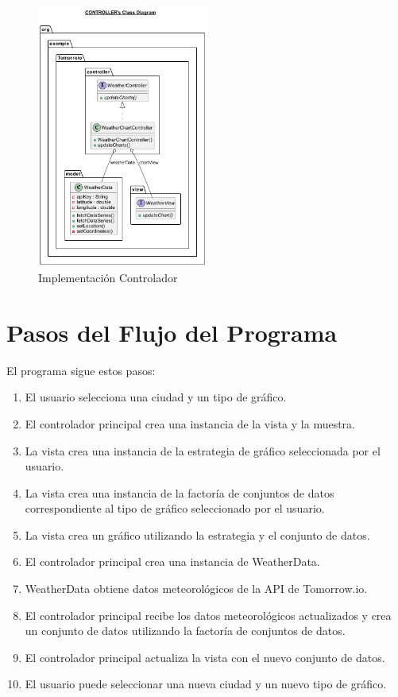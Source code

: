 \documentclass{article}
\begin{document}
\begin{figure}[H]
  \centering
  \includegraphics[width=0.5\textwidth]{images/image3.png}
  \caption {Implementación Controlador}
  \label{fig:image3}
\end{figure}

\section{Pasos del Flujo del Programa}
El programa sigue estos pasos:

\begin{enumerate}
  \item El usuario selecciona una ciudad y un tipo de gráfico.
  \item El controlador principal crea una instancia de la vista y la muestra.
  \item La vista crea una instancia de la estrategia de gráfico seleccionada por el usuario.
  \item La vista crea una instancia de la factoría de conjuntos de datos correspondiente al tipo de gráfico seleccionado por el usuario.
  \item La vista crea un gráfico utilizando la estrategia y el conjunto de datos.
  \item El controlador principal crea una instancia de WeatherData.
  \item WeatherData obtiene datos meteorológicos de la API de Tomorrow.io.
  \item El controlador principal recibe los datos meteorológicos actualizados y crea un conjunto de datos utilizando la factoría de conjuntos de datos.
  \item El controlador principal actualiza la vista con el nuevo conjunto de datos.
  \item El usuario puede seleccionar una nueva ciudad y un nuevo tipo de gráfico.
\end{enumerate}
\end{document}
